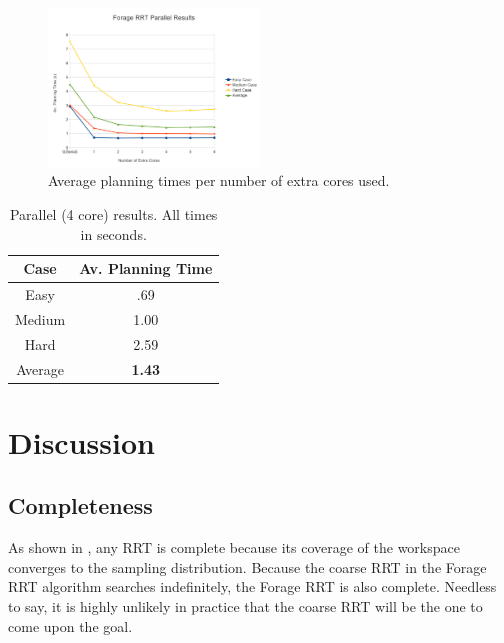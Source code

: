 \documentclass[conference]{IEEEtran}
\begin{document}
\begin{figure}[h!]
  \centering
    \includegraphics[width=0.5\textwidth]{figures/ParallelGraph.pdf}
  \caption{Average planning times per number of extra cores used. \label{fig:ParallelResults} }
\end{figure}

\begin{table}
        \centering
        \begin{tabular}{| c | c | }
                \hline
                Case & \textbf{Av. Planning Time} \\  \hline
                Easy & .69 \\  \hline
		Medium & 1.00 \\  \hline
		Hard & 2.59 \\  \hline
		Average &\textbf{1.43} \\  \hline
        \end{tabular}
        \caption{Parallel (4 core) results. All times in seconds.}
        \label{tab:BestParallel}
\end{table}



\section{Discussion}
\subsection{Completeness}
As shown in \cite{lavalle00}, any RRT is complete because its coverage of the workspace converges to the sampling distribution. Because the
coarse RRT in the Forage RRT algorithm searches indefinitely, the Forage RRT is also complete. Needless to say, it is highly unlikely in
practice that the coarse RRT will be the one to come upon the goal.
\end{document}
